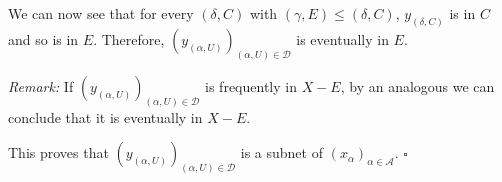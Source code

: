\documentclass[12pt]{article}
\begin{document}
We can now see that for every $(\delta,C)$ with $(\gamma,E) \leq (\delta,C)$, $y_{(\delta,C)}$ is in $C$ and so is in $E$. Therefore, $(y_{(\alpha,U)})_{(\alpha,U) \in \mathcal{D}}$ is eventually in $E$.

\emph{Remark:} If $(y_{(\alpha,U)})_{(\alpha,U) \in \mathcal{D}}$ is frequently in $X-E$, by an analogous  we can conclude that it is eventually in $X-E$.

This proves that $(y_{(\alpha,U)})_{(\alpha,U) \in \mathcal{D}}$ is a  subnet of $(x_{\alpha})_{\alpha \in \mathcal{A}}$. $\square$
\end{document}
